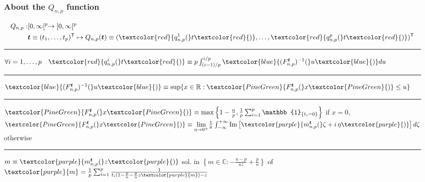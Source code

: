 \documentclass[xcolor=dvipsnames]{beamer}
\def\B#1{\bm{#1}}
\def\trans{^\mathsf{T}}
\begin{document}
\begin{frame}
  \frametitle{About the $Q_{n,p}$ function}

  \begin{equation*}
    \begin{split}
      Q_{n,p}: & [0, \infty[^p \rightarrow [0,\infty[^p \\
              & \B{t} \equiv (t_1,\ldots,t_p)\trans
              \mapsto Q_{n,p}(\B{t}) \equiv
              (\textcolor{red}{q^1_{n,p}(}t\textcolor{red}{)},\ldots,\textcolor{red}{q^p_{n,p}(}t\textcolor{red}{)})\trans
    \end{split}
  \end{equation*}

  \vfill
  \hrule{}
  \vfill

  $\forall i = 1, \ldots, p \quad \textcolor{red}{q^i_{n,p}(}t\textcolor{red}{)} \equiv
  p\int_{(i-1)/p}^{i/p}\textcolor{blue}{(F^{\B{t}}_{n,p})^{-1}(}u\textcolor{blue}{)}du$

  \vfill
  \hrule{}
  \vfill
  
  $\textcolor{blue}{(F^{\B{t}}_{n,p})^{-1}(}u\textcolor{blue}{)} \equiv \sup\{x \in \mathbb{R}: \textcolor{PineGreen}{F^{\B{t}}_{n,p}(}x\textcolor{PineGreen}{)} \leq u\}$

  \vfill
  \hrule{}
  \vfill
  
  $\textcolor{PineGreen}{F^{\B{t}}_{n,p}(}x\textcolor{PineGreen}{)} \equiv \max \left\{1 - \frac{n}{p}, \frac{1}{p}\sum^p_{i=1}\mathbb{1}_{\{t_i = 0\}}\right\}$ if $x = 0$, $\textcolor{PineGreen}{F^{\B{t}}_{n,p}(}x\textcolor{PineGreen}{)} \equiv \underset{\eta \rightarrow 0^+}{\lim}\frac{1}{\pi}\int^{+\infty}_{-\infty}\text{Im}\left[\textcolor{purple}{m^{\B{t}}_{n,p}(}\zeta + i\,\eta\textcolor{purple}{)}\right]d\zeta$ otherwise

  \vfill
  \hrule{}
  \vfill

  $m \equiv \textcolor{purple}{m^{\B{t}}_{n,p}(}z\textcolor{purple}{)}$ sol. in $\left\{m \in \mathbb{C}: -\frac{n-p}{nz} + \frac{p}{n}\right\}$ of $\textcolor{purple}{m} = \frac{1}{p}\sum^p_{i=1}\frac{1}{t_i(1 - \frac{p}{n} - \frac{p}{n}z\textcolor{purple}{m}) - z}$

\end{frame}
\end{document}
